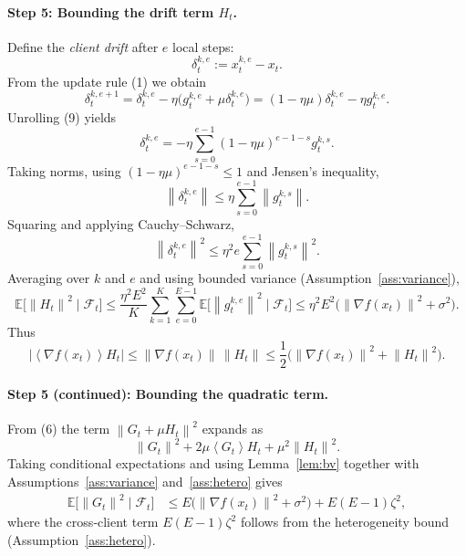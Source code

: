 \documentclass{article}
\newcommand{\E}{\mathbb{E}}
\newcommand{\norm}[1]{\left\|#1\right\|}
\newcommand{\inner}[1]{\left\langle #1 \right\rangle}
\begin{document}
\paragraph{Step 5: Bounding the drift term $H_t$.}
Define the \emph{client drift} after $e$ local steps:
\[
\delta_{t}^{k,e}:=x_{t}^{k,e}-x_t .
\]
From the update rule (1) we obtain
\[
\delta_{t}^{k,e+1}= \delta_{t}^{k,e}
        -\eta\bigl(g_{t}^{k,e}+ \mu\delta_{t}^{k,e}\bigr)
        = (1-\eta\mu)\delta_{t}^{k,e}-\eta g_{t}^{k,e}. \tag{9}
\]
Unrolling (9) yields
\[
\delta_{t}^{k,e}= -\eta\sum_{s=0}^{e-1}(1-\eta\mu)^{e-1-s}g_{t}^{k,s}. \tag{10}
\]
Taking norms, using $(1-\eta\mu)^{e-1-s}\le 1$ and Jensen’s inequality,
\[
\norm{\delta_{t}^{k,e}} \le \eta\sum_{s=0}^{e-1}\norm{g_{t}^{k,s}}. \tag{11}
\]
Squaring and applying Cauchy–Schwarz,
\[
\norm{\delta_{t}^{k,e}}^2 \le \eta^2 e\sum_{s=0}^{e-1}\norm{g_{t}^{k,s}}^2. \tag{12}
\]
Averaging over $k$ and $e$ and using bounded variance (Assumption~\ref{ass:variance}),
\[
\E\!\bigl[\norm{H_t}^2\mid\mathcal{F}_t\bigr]
   \le \frac{\eta^2E^2}{K}\sum_{k=1}^K\sum_{e=0}^{E-1}
        \E\!\bigl[\norm{g_{t}^{k,e}}^2\mid\mathcal{F}_t\bigr]
   \le \eta^2E^2\bigl(\norm{\nabla f(x_t)}^2+\sigma^2\bigr). \tag{13}
\]
Thus
\[
\bigl|\inner{\nabla f(x_t)}{H_t}\bigr|
 \le \norm{\nabla f(x_t)}\,\norm{H_t}
 \le \frac12\bigl(\norm{\nabla f(x_t)}^2+\norm{H_t}^2\bigr). \tag{14}
\]

\paragraph{Step 5 (continued): Bounding the quadratic term.}
From (6) the term $\norm{G_t+\mu H_t}^2$ expands as
\[
\norm{G_t}^2+2\mu\inner{G_t}{H_t}+ \mu^2\norm{H_t}^2. \tag{15}
\]
Taking conditional expectations and using Lemma~\ref{lem:bv} together with
Assumptions~\ref{ass:variance} and~\ref{ass:hetero} gives
\begin{align}
\E\!\bigl[\norm{G_t}^2\mid\mathcal{F}_t\bigr]
   &\le E\!\bigl(\norm{\nabla f(x_t)}^2+\sigma^2\bigr)
      +E(E-1)\zeta^2, \tag{16}
\end{align}
where the cross‑client term $E(E-1)\zeta^2$ follows from the heterogeneity bound
(Assumption~\ref{ass:hetero}).
\end{document}
